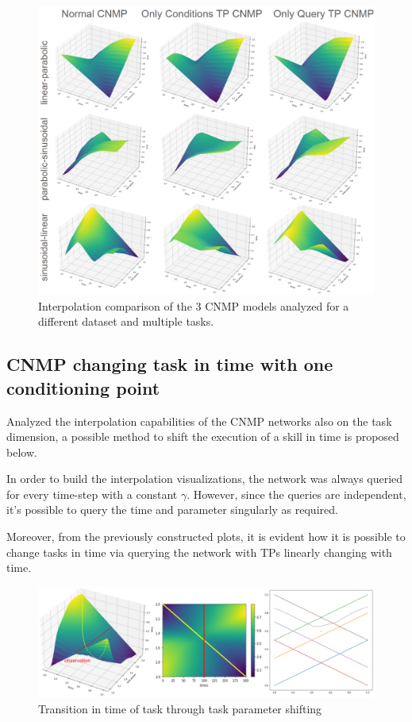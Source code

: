 \begin{figure}
    \centering
    \includegraphics[width=0.9\linewidth]{figures/comparisonCNMP3trajectories.png}
    \caption{ Interpolation comparison of the 3 CNMP models analyzed for a different dataset and multiple tasks. }
    \label{fig:comparisonCNMP3trajectories}
\end{figure}


\newpage
\subsection{CNMP changing task in time with one conditioning point}
Analyzed the interpolation capabilities of the CNMP networks also on the task dimension, a possible method to shift the execution of a skill in time is proposed below. 

In order to build the interpolation visualizations, the network was always queried for every time-step with a constant $\gamma$. 
However, since the queries are independent, it's possible to query the time and parameter singularly as required.

Moreover, from the previously constructed plots, it is evident how it is possible to change tasks in time via querying the network with TPs linearly changing with time.

\begin{figure}
    \centering
    \includegraphics[width=0.95\linewidth]{figures/tpshift.png}
    \caption{ Transition in time of task through task parameter shifting }
    \label{fig:tpshift}
\end{figure}

